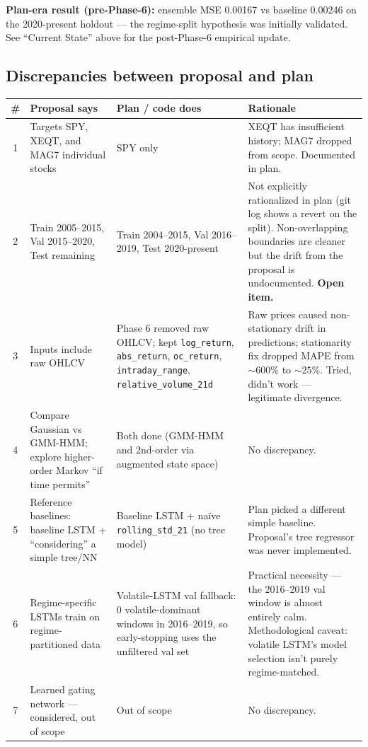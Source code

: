 \documentclass[11pt]{article}
\begin{document}
\textbf{Plan-era result (pre-Phase-6):} ensemble MSE 0.00167 vs baseline 0.00246 on the 2020-present holdout --- the regime-split hypothesis was initially validated. See ``Current State'' above for the post-Phase-6 empirical update.

\subsection*{Discrepancies between proposal and plan}

\begin{center}
\renewcommand{\arraystretch}{1.15}
\begin{tabular}{@{}c p{3.4cm} p{4.4cm} p{5.8cm}@{}}
\toprule
\# & Proposal says & Plan / code does & Rationale \\
\midrule
1 & Targets SPY, XEQT, and MAG7 individual stocks & SPY only & XEQT has insufficient history; MAG7 dropped from scope. Documented in plan. \\
2 & Train 2005--2015, Val 2015--2020, Test remaining & Train 2004--2015, Val 2016--2019, Test 2020-present & Not explicitly rationalized in plan (git log shows a revert on the split). Non-overlapping boundaries are cleaner but the drift from the proposal is undocumented. \textbf{Open item.} \\
3 & Inputs include raw OHLCV & Phase 6 removed raw OHLCV; kept \texttt{log\_return}, \texttt{abs\_return}, \texttt{oc\_return}, \texttt{intraday\_range}, \texttt{relative\_volume\_21d} & Raw prices caused non-stationary drift in predictions; stationarity fix dropped MAPE from ${\sim}600$\% to ${\sim}25$\%. Tried, didn't work --- legitimate divergence. \\
4 & Compare Gaussian vs GMM-HMM; explore higher-order Markov ``if time permits'' & Both done (GMM-HMM and 2nd-order via augmented state space) & No discrepancy. \\
5 & Reference baselines: baseline LSTM + ``considering'' a simple tree/NN & Baseline LSTM + na\"ive \texttt{rolling\_std\_21} (no tree model) & Plan picked a different simple baseline. Proposal's tree regressor was never implemented. \\
6 & Regime-specific LSTMs train on regime-partitioned data & Volatile-LSTM val fallback: 0 volatile-dominant windows in 2016--2019, so early-stopping uses the unfiltered val set & Practical necessity --- the 2016--2019 val window is almost entirely calm. Methodological caveat: volatile LSTM's model selection isn't purely regime-matched. \\
7 & Learned gating network --- considered, out of scope & Out of scope & No discrepancy. \\

\end{tabular}
\end{center}
\end{document}
